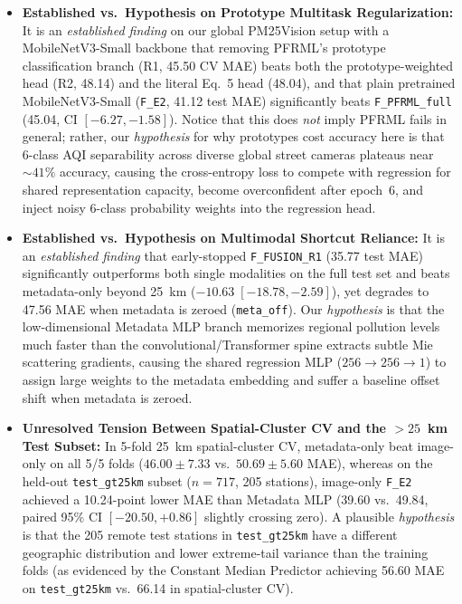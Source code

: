 \documentclass[conference]{IEEEtran}
\begin{document}
\begin{itemize}
  \item \textbf{Established vs.\ Hypothesis on Prototype Multitask
        Regularization:} It is an \textit{established finding} on our global
        PM25Vision setup with a MobileNetV3-Small backbone that removing PFRML's
        prototype classification branch (R1, 45.50 CV MAE) beats both the
        prototype-weighted head (R2, 48.14) and the literal Eq.~5 head (48.04),
        and that plain pretrained MobileNetV3-Small (\texttt{F\_E2}, 41.12 test
        MAE) significantly beats \texttt{F\_PFRML\_full} (45.04, CI
        $[-6.27, -1.58]$). Notice that this does \textit{not} imply PFRML fails
        in general; rather, our \textit{hypothesis} for why prototypes cost
        accuracy here is that 6-class AQI separability across diverse global
        street cameras plateaus near $\sim 41\%$ accuracy, causing the
        cross-entropy loss to compete with regression for shared representation
        capacity, become overconfident after epoch~6, and inject noisy 6-class
        probability weights into the regression head.
  \item \textbf{Established vs.\ Hypothesis on Multimodal Shortcut Reliance:} It
        is an \textit{established finding} that early-stopped
        \texttt{F\_FUSION\_R1} (35.77 test MAE) significantly outperforms both
        single modalities on the full test set and beats metadata-only beyond
        25~km ($-10.63\;[-18.78, -2.59]$), yet degrades to 47.56 MAE when
        metadata is zeroed (\texttt{meta\_off}). Our \textit{hypothesis} is that
        the low-dimensional Metadata MLP branch memorizes regional pollution
        levels much faster than the convolutional/Transformer spine extracts
        subtle Mie scattering gradients, causing the shared regression MLP
        ($256 \to 256 \to 1$) to assign large weights to the metadata embedding
        and suffer a baseline offset shift when metadata is zeroed.
  \item \textbf{Unresolved Tension Between Spatial-Cluster CV and the
        $> 25$~km Test Subset:} In 5-fold 25~km spatial-cluster CV,
        metadata-only beat image-only on all 5/5 folds ($46.00 \pm 7.33$
        vs.\ $50.69 \pm 5.60$ MAE), whereas on the held-out
        \texttt{test\_gt25km} subset ($n = 717$, 205 stations), image-only
        \texttt{F\_E2} achieved a 10.24-point lower MAE than Metadata MLP (39.60
        vs.\ 49.84, paired 95\% CI $[-20.50, +0.86]$ slightly crossing zero). A
        plausible \textit{hypothesis} is that the 205 remote test stations in
        \texttt{test\_gt25km} have a different geographic distribution and lower
        extreme-tail variance than the training folds (as evidenced by the
        Constant Median Predictor achieving 56.60 MAE on \texttt{test\_gt25km}
        vs.\ 66.14 in spatial-cluster CV).
\end{itemize}
\end{document}
